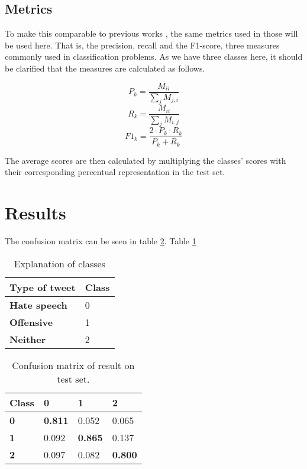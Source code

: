 \documentclass[twocolumn]{article}
\begin{document}
\subsection{Metrics}

To make this comparable to previous works \cite{Gambck2017, DLNN, gaydhani}, the same metrics used in those will be used here. That is, the precision, recall and the F1-score, three measures commonly used in classification problems. As we have three classes here, it should be clarified that the measures are calculated as follows. 

\begin{equation}
P_k = \frac{M_{ii}}{\sum_j M_{j,i}}
\end{equation}
\begin{equation}
R_k = \frac{M_{ii}}{\sum_j M_{i,j}}
\end{equation}
\begin{equation}
F1_k = \frac{2\cdot P_k \cdot R_k}{P_k + R_k}
\end{equation}

The average scores are then calculated by multiplying the classes' scores with their corresponding percentual representation in the test set. 
\section{Results}


The confusion matrix can be seen in table  \ref{tab:conf_m_test}. Table \ref{tab:explan}

\begin{table}[h]
\caption{Explanation of classes}
\label{tab:explan}
\begin{tabular}{|l|l|}
\hline
 \textbf{Type of tweet}                                     & \textbf{Class} \\ \hline
\textbf{Hate speech}                 & 0               \\ \hline
\textbf{Offensive} & 1               \\ \hline
\textbf{Neither}                   & 2               \\ \hline
\end{tabular}
\end{table}

\begin{table}[h]
\caption{Confusion matrix of result on test set. }
\label{tab:conf_m_test}
\begin{tabular}{|l|l|l|l|}
\hline
      Class           & \textbf{0} & \textbf{1} & \textbf{2} \\ \hline
\textbf{0}     & \textbf{0.811}  & 0.052              & 0.065               \\ \hline
\textbf{1}  & 0.092           & \textbf{0.865}     & 0.137               \\ \hline
\textbf{2} & 0.097           & 0.082              & \textbf{0.800}      \\ \hline
\end{tabular}
\end{table}
\end{document}
